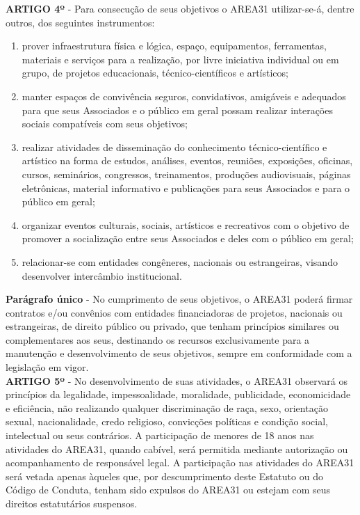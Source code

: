 \textbf{ARTIGO 4º} - Para consecução de seus objetivos o AREA31 utilizar-se-á, 
dentre outros, dos seguintes instrumentos:

\begin{enumerate}[label=\Roman* -]
    \item prover infraestrutura física e lógica, espaço, equipamentos, 
        ferramentas, materiais e serviços para a realização, 
        por livre iniciativa individual ou em grupo, de projetos educacionais,
        técnico-científicos e artísticos;
    \item manter espaços de convivência seguros, convidativos, amigáveis 
        e adequados para que seus Associados e o público em geral possam 
        realizar interações sociais compatíveis com seus objetivos;
    \item realizar atividades de disseminação do conhecimento 
        técnico-científico e artístico na forma de estudos, análises, 
        eventos, reuniões, exposições, oficinas, cursos, seminários, 
        congressos, treinamentos, produções audiovisuais, páginas eletrônicas,
        material informativo e publicações para seus Associados e para o 
        público em geral;
    \item organizar eventos culturais, sociais, artísticos e recreativos 
        com o objetivo de promover a socialização entre seus Associados 
        e deles com o público em geral; 
    \item relacionar-se com entidades congêneres, nacionais ou 
        estrangeiras, visando desenvolver intercâmbio institucional.
\end{enumerate}


\textbf{Parágrafo único} - No cumprimento de seus objetivos, o AREA31 poderá 
firmar contratos e/ou convênios com entidades financiadoras de projetos, 
nacionais ou estrangeiras, de direito público ou privado, que tenham 
princípios similares ou complementares aos seus, destinando os recursos 
exclusivamente para a manutenção e desenvolvimento de seus objetivos, 
sempre em conformidade com a legislação em vigor.
\\

\textbf{ARTIGO 5º} - No desenvolvimento de suas atividades, o AREA31 
observará os princípios da legalidade, impessoalidade, moralidade, 
publicidade, economicidade e eficiência, não realizando qualquer 
discriminação de raça, sexo, orientação sexual, nacionalidade, 
credo religioso, convicções políticas e condição social, intelectual ou 
seus contrários.
A participação de menores de 18 anos nas atividades do AREA31, quando cabível,
será permitida mediante autorização ou acompanhamento de responsável legal.
A participação nas atividades do AREA31 será vetada apenas àqueles que, 
por descumprimento deste Estatuto ou do Código de Conduta, tenham sido 
expulsos do AREA31 ou estejam com seus direitos estatutários suspensos.

